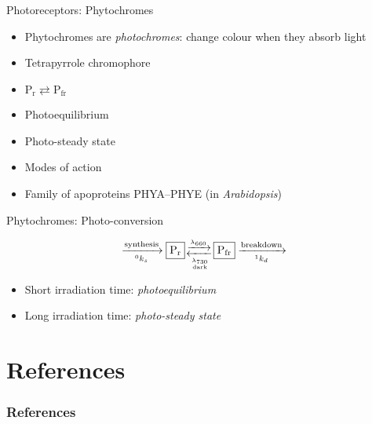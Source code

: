 \documentclass[10pt]{beamer}\usepackage[]{graphicx}\usepackage[]{color}
\newcommand*{\Pxfr}{\ensuremath{\mathrm{P_{fr}}}\xspace}
\newcommand*{\Pxr}{\ensuremath{\mathrm{P_r}}\xspace}
\newcommand*{\myatop}[2]{\genfrac{}{}{0pt}{3}{#1}{#2}}
\begin{document}
\begin{frame}{Photoreceptors: Phytochromes}
    \begin{itemize}
        \item Phytochromes are \textit{photochromes}: change colour when they absorb
        light
        \item Tetrapyrrole chromophore
        \item $\Pxr \rightleftarrows \Pxfr$
        \item Photoequilibrium
        \item Photo-steady state
        \item Modes of action
        \item Family of apoproteins PHYA--PHYE (in \textit{Arabidopsis})
    \end{itemize}
\end{frame}

\begin{frame}{Phytochromes: Photo-conversion}
\begin{large}
\begin{equation*}
    \xrightarrow[^0k_s]{\mathrm{synthesis}}
    \fbox{\Pxr} \myatop{\xrightarrow{\lambda_{660}}}{\xleftarrow[\myatop{\lambda_{730}}{\mathrm{dark}}]{}}
    \fbox{\Pxfr} \xrightarrow[^1k_d]{\mathrm{breakdown}}
\end{equation*}
\end{large}

    \begin{itemize}
      \item Short irradiation time: \emph{photoequilibrium}
      \item Long irradiation time: \emph{photo-steady state}
    \end{itemize}
\end{frame}

\section*{References}

\nocite{Rai2020,Mancinelli1994,Christie2002,Christie2015,Banerjee2007,Song2006a,Zeugner2005,Aphalo2021a}
  \begin{frame}[t,allowframebreaks]
    \frametitle{References}
    \printbibliography
  \end{frame}
\end{document}
